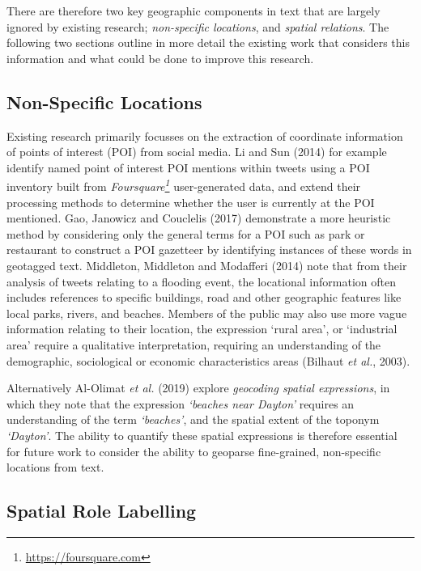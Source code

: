 \documentclass[
  letterpaper,
  11pt,
  english,
  onehalfspacing,
  headsepline]{MastersDoctoralThesis}
\begin{document}
There are therefore two key geographic components in text that are
largely ignored by existing research; \emph{non-specific locations}, and
\emph{spatial relations}. The following two sections outline in more
detail the existing work that considers this information and what could
be done to improve this research.

\hypertarget{non-specific-locations}{%
\subsection{Non-Specific Locations}\label{non-specific-locations}}

Existing research primarily focusses on the extraction of coordinate
information of points of interest (POI) from social media. Li and Sun
(2014) for example identify named point of interest POI mentions within
tweets using a POI inventory built from \emph{Foursquare\footnote{\url{https://foursquare.com}}}
user-generated data, and extend their processing methods to determine
whether the user is currently at the POI mentioned. Gao, Janowicz and
Couclelis (2017) demonstrate a more heuristic method by considering only
the general terms for a POI such as park or restaurant to construct a
POI gazetteer by identifying instances of these words in geotagged text.
Middleton, Middleton and Modafferi (2014) note that from their analysis
of tweets relating to a flooding event, the locational information often
includes references to specific buildings, road and other geographic
features like local parks, rivers, and beaches. Members of the public
may also use more vague information relating to their location, the
expression `rural area', or `industrial area' require a qualitative
interpretation, requiring an understanding of the demographic,
sociological or economic characteristics areas (Bilhaut \emph{et al.},
2003).

Alternatively Al-Olimat \emph{et al.} (2019) explore \emph{geocoding
spatial expressions}, in which they note that the expression
\emph{`beaches near Dayton'} requires an understanding of the term
\emph{`beaches'}, and the spatial extent of the toponym \emph{`Dayton'}.
The ability to quantify these spatial expressions is therefore essential
for future work to consider the ability to geoparse fine-grained,
non-specific locations from text.

\hypertarget{spatial-role-labelling}{%
\subsection{Spatial Role Labelling}\label{spatial-role-labelling}}
\end{document}
